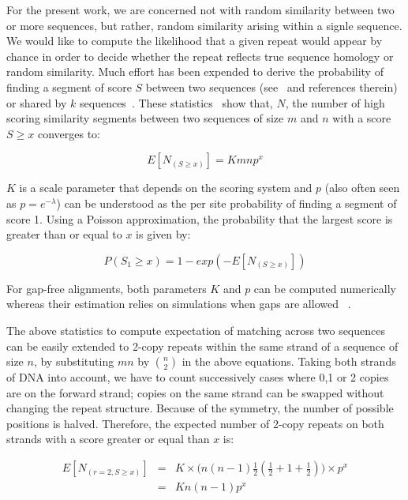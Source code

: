 \documentclass[9.5pt,journal,final,finalsubmission,twocolumn]{IEEEtran}
\begin{document}
For the present work, we are concerned not with random similarity between two or more sequences, but rather, random similarity arising within a signle sequence.  We would like to compute the likelihood that a given repeat would appear by chance in order to decide whether the repeat reflects true sequence homology or random similarity.  Much effort has been expended to derive the probability of finding a segment of score $S$ between two sequences (see~\cite{Ewens2001} and references therein) or shared by $k$ sequences~\cite{ref-related1}. These statistics~\cite{Karlin1990} show that, $N$, the number of high scoring similarity segments between two sequences of size $m$ and $n$ with a score $S \geq x$ converges to:

\begin{equation}
    E[ N_{(S\geq x)} ] = Kmn p^x
    \label{E_mn}
\end{equation}

$K$ is a scale parameter that depends on the scoring system and $p$ (also often seen as $p=e^{-\lambda}$) can be understood as the per site probability of finding a segment of score 1. Using a Poisson approximation, the probability that the largest score is greater than or equal to $x$ is given by:

\begin{equation}
    P( S_1 \geq x) = 1 - exp( -E[ N_{(S\geq x)} ] )
    \label{P_s1}
\end{equation}

For gap-free alignments, both parameters $K$ and $p$ can be computed numerically~\cite{Karlin1990} whereas their estimation relies on simulations when gaps are allowed  ~\cite{Waterman1994, Altschul2001}.

The above statistics to compute expectation of matching across two sequences can be easily extended to 2-copy repeats within the same strand of a sequence of size $n$, by substituting $mn$ by ${{n}\choose{2}}$ in the above equations. Taking both strands of DNA into account, we have to count successively cases where 0,1 or 2 copies are on the forward strand; copies on the same strand can be swapped without changing the repeat structure. Because of the symmetry, the number of possible positions is halved. Therefore, the expected number of 2-copy repeats on both strands with a score greater or equal than $x$ is:

\begin{eqnarray}
    E[ N_{(r=2, S\geq x)} ]  & = & K \times  \Big( n (n-1) \frac 12 (\frac 1 2 + 1 + \frac 1 2) \Big) \times  p^x \nonumber \\
                                          & = & K  n (n-1)   p^x
    \label{E_r2}
\end{eqnarray}
\end{document}
